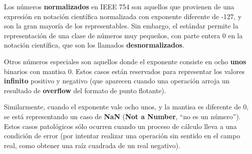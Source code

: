 \documentclass[spanish,A4,]{article}
\begin{document}
Los números \textbf{normalizados} en IEEE 754 son aquellos que provienen
de una expresión en notación científica normalizada con exponente
diferente de -127, y son la gran mayoría de los representables. Sin
embargo, el estándar permite la representación de una clase de números
muy pequeños, con parte entera 0 en la notación científica, que son los
llamados \textbf{desnormalizados}.

Otros números especiales son aquellos donde el exponente consiste en
ocho \textbf{unos} binarios con mantisa 0. Estos casos están reservados
para representar los valores \textbf{infinito} positivo y negativo (que
aparecen cuando una operación arroja un resultado de \textbf{overflow}
del formato de punto flotante).

Similarmente, cuando el exponente vale ocho unos, y la mantisa es
diferente de 0, se está representando un caso de \textbf{NaN}
(\textbf{Not a Number}, ``no es un número''). Estos casos patológicos
sólo ocurren cuando un proceso de cálculo lleva a una condición de error
(por intentar realizar una operación sin sentido en el campo real, como
obtener una raíz cuadrada de un real negativo).
\end{document}
